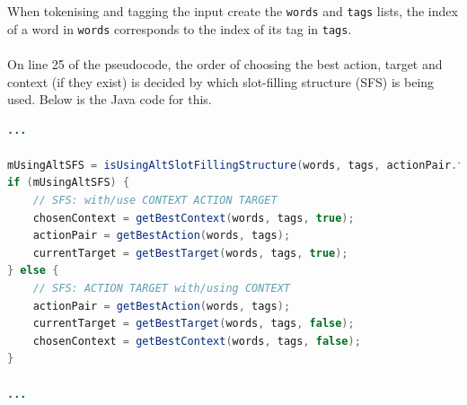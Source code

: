 \documentclass[11pt]{article}
\begin{document}
When tokenising and tagging the input create the \texttt{words} and \texttt{tags} lists, the index of a word in \texttt{words} corresponds to the index of its tag in \texttt{tags}.
\\
\\
On line 25 of the pseudocode, the order of choosing the best action, target and context (if they exist) is decided by which slot-filling structure (SFS) is being used. Below is the Java code for this.
\\
\begin{lstlisting}[language=Java, label={lst:sfs}]
...

mUsingAltSFS = isUsingAltSlotFillingStructure(words, tags, actionPair.first);
if (mUsingAltSFS) {
    // SFS: with/use CONTEXT ACTION TARGET
    chosenContext = getBestContext(words, tags, true);
    actionPair = getBestAction(words, tags);
    currentTarget = getBestTarget(words, tags, true);
} else {
    // SFS: ACTION TARGET with/using CONTEXT
    actionPair = getBestAction(words, tags);
    currentTarget = getBestTarget(words, tags, false);
    chosenContext = getBestContext(words, tags, false);
}

...
\end{lstlisting}
\end{document}
